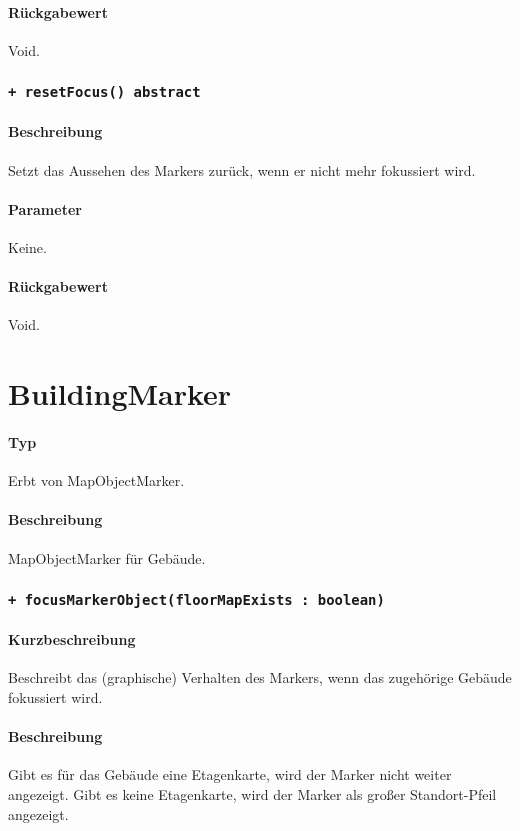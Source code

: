 \paragraph*{Rückgabewert}
Void.

\subsubsection{\texttt{+ resetFocus() {abstract}}}%
\paragraph*{Beschreibung}
Setzt das Aussehen des Markers zurück, wenn er nicht mehr fokussiert wird.
\paragraph*{Parameter}
Keine.
\paragraph*{Rückgabewert}
Void.

\section{BuildingMarker}
\paragraph*{Typ} 
Erbt von MapObjectMarker.
\paragraph*{Beschreibung}
MapObjectMarker für Gebäude.

\subsubsection{\texttt{+ focusMarkerObject(floorMapExists : boolean)}}%
\paragraph*{Kurzbeschreibung}
Beschreibt das (graphische) Verhalten des Markers, wenn das zugehörige Gebäude fokussiert wird.
\paragraph*{Beschreibung}
Gibt es für das Gebäude eine Etagenkarte, wird der Marker nicht weiter angezeigt.
Gibt es keine Etagenkarte, wird der Marker als großer Standort-Pfeil angezeigt.
